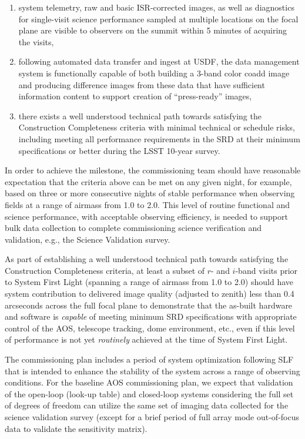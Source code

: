 \documentclass[SE,authoryear,toc]{lsstdoc}
\begin{document}
\begin{enumerate}
\begin{enumerate}
  \end{enumerate}
  \item system telemetry, raw and basic ISR-corrected images, as well as diagnostics for single-visit science performance sampled at multiple locations on the focal plane are visible to observers on the summit within 5 minutes of acquiring the visits,
  \item following automated data transfer and ingest at USDF, the data management system is functionally capable of both building a 3-band color coadd image and producing difference images from these data that have sufficient information content to support creation of ``press-ready'' images,
  \item there exists a well understood technical path towards satisfying the Construction Completeness criteria  with minimal technical or schedule risks, including meeting all performance requirements in the SRD at their minimum specifications or better during the LSST 10-year survey.
\end{enumerate}

In order to achieve the milestone, the commissioning team should have reasonable expectation that the criteria above can be met on any given night, for example, based on three or more consecutive nights of stable performance when observing fields at a range of airmass from 1.0 to 2.0.
This level of routine functional and science performance, with acceptable observing efficiency, is needed to support bulk data collection to complete commissioning science verification and validation, e.g., the Science Validation survey.

As part of establishing a well understood technical path towards satisfying the Construction Completeness criteria, at least a subset of $r$- and $i$-band visits prior to System First Light (spanning a range of airmass from 1.0 to 2.0) should have system contribution to delivered image quality (adjusted to zenith) less than 0.4 arcseconds across the full focal plane to demonstrate that the as-built hardware and software is \emph{capable} of meeting minimum SRD specifications with appropriate control of the AOS, telescope tracking, dome environment, etc., even if this level of performance is not yet \emph{routinely} achieved at the time of System First Light.

The commissioning plan includes a period of system optimization following SLF that is intended to enhance the stability of the system across a range of observing conditions.
For the baseline AOS commissioning plan, we expect that validation of the open-loop (look-up table) and closed-loop systems considering the full set of degrees of freedom can utilize the same set of imaging data collected for the science validation survey (except for a brief period of full array mode out-of-focus data to validate the sensitivity matrix).
\end{document}
